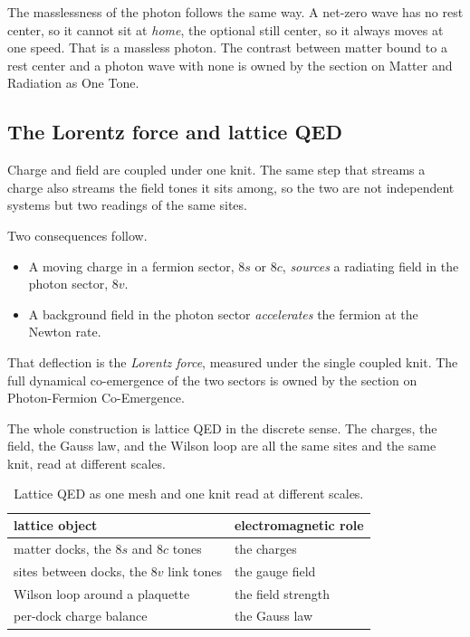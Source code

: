 The masslessness of the photon follows the same way. A net-zero wave has no rest center, so it cannot sit at \emph{home}, the optional still center, so it always moves at one speed. That is a massless photon. The contrast between matter bound to a rest center and a photon wave with none is owned by the section on Matter and Radiation as One Tone.

\subsection{The Lorentz force and lattice QED}

Charge and field are coupled under one knit. The same step that streams a charge also streams the field tones it sits among, so the two are not independent systems but two readings of the same sites.

Two consequences follow.

\begin{itemize}
\item A moving charge in a fermion sector, $8s$ or $8c$, \emph{sources} a radiating field in the photon sector, $8v$.
\item A background field in the photon sector \emph{accelerates} the fermion at the Newton rate.
\end{itemize}

That deflection is the \emph{Lorentz force}, measured under the single coupled knit. The full dynamical co-emergence of the two sectors is owned by the section on Photon-Fermion Co-Emergence.

The whole construction is lattice QED in the discrete sense. The charges, the field, the Gauss law, and the Wilson loop are all the same sites and the same knit, read at different scales.

\begin{table}[ht]
\centering
\begin{tabular}{@{}ll@{}}
\toprule
lattice object & electromagnetic role \\
\midrule
matter docks, the $8s$ and $8c$ tones & the charges \\
sites between docks, the $8v$ link tones & the gauge field \\
Wilson loop around a plaquette & the field strength \\
per-dock charge balance & the Gauss law \\
\bottomrule
\end{tabular}
\caption{Lattice QED as one mesh and one knit read at different scales.}
\label{tab:em-qed}
\end{table}

